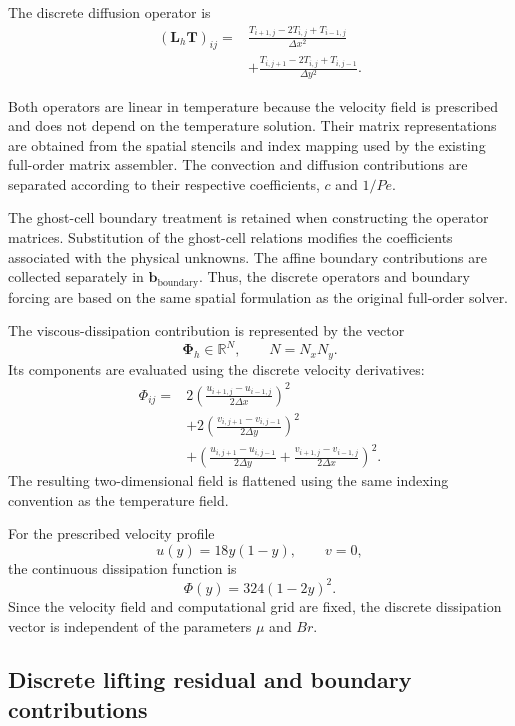 The discrete diffusion operator is
\begin{align}
    (\mathbf{L}_h\mathbf{T})_{ij}
    ={}&
    \frac{
    T_{i+1,j}-2T_{i,j}+T_{i-1,j}
    }{\Delta x^2}
    \nonumber\\
    &+
    \frac{
    T_{i,j+1}-2T_{i,j}+T_{i,j-1}
    }{\Delta y^2}.
    \label{eq:discrete_diffusion_operator}
\end{align}

Both operators are linear in temperature because the velocity
field is prescribed and does not depend on the temperature
solution. Their matrix representations are obtained from the
spatial stencils and index mapping used by the existing
full-order matrix assembler. The convection and diffusion
contributions are separated according to their respective
coefficients, $c$ and $1/Pe$.

The ghost-cell boundary treatment is retained when constructing
the operator matrices. Substitution of the ghost-cell relations
modifies the coefficients associated with the physical
unknowns. The affine boundary contributions are collected
separately in $\mathbf{b}_{\mathrm{boundary}}$. Thus, the
discrete operators and boundary forcing are based on the same
spatial formulation as the original full-order solver.

The viscous-dissipation contribution is represented by the
vector
\[
\boldsymbol{\Phi}_h\in\mathbb{R}^{N},
\qquad N=N_xN_y.
\]
Its components are evaluated using the discrete velocity
derivatives:
\begin{align}
    \Phi_{ij}={}&
    2\left(
    \frac{u_{i+1,j}-u_{i-1,j}}{2\Delta x}
    \right)^2
    \nonumber\\
    &+
    2\left(
    \frac{v_{i,j+1}-v_{i,j-1}}{2\Delta y}
    \right)^2
    \nonumber\\
    &+
    \left(
    \frac{u_{i,j+1}-u_{i,j-1}}{2\Delta y}
    +
    \frac{v_{i+1,j}-v_{i-1,j}}{2\Delta x}
    \right)^2.
    \label{eq:discrete_dissipation}
\end{align}
The resulting two-dimensional field is flattened using the
same indexing convention as the temperature field.

For the prescribed velocity profile
\[
u(y)=18y(1-y),\qquad v=0,
\]
the continuous dissipation function is
\[
\Phi(y)=324(1-2y)^2.
\]
Since the velocity field and computational grid are fixed,
the discrete dissipation vector is independent of the
parameters $\mu$ and $Br$.

\subsection{Discrete lifting residual and boundary contributions}

